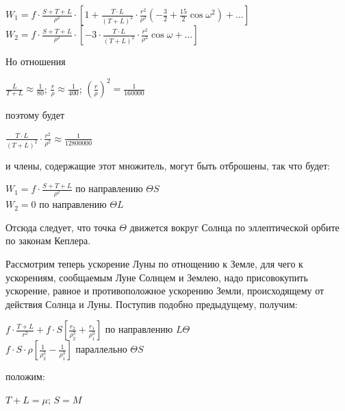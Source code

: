 \documentclass[a4paper,12pt]{article}
\begin{document}
\begin{center}
	$W_1 = f \cdot \frac{S+T+L}{\rho^2} \cdot \left[ 1+ \frac{T \cdot L}{(T+L)^2} \cdot \frac{r^2}{\rho^2}\left(-\frac{3}{2}+\frac{15}{2}\cos\omega^2 \right) + \ldots \right]$\\
	$W_2 = f \cdot \frac{S+T+L}{\rho^2} \cdot \left[ -3 \cdot \frac{T \cdot L}{(T+L)^2} \cdot \frac{r^2}{\rho^2} \cos \omega + \ldots \right]$
\end{center}

Но отношения 
\begin{center}
	$\frac{L}{T+L} \approx \frac{1}{80}$; $\frac{r}{\rho} \approx \frac{1}{400}$; $\left(\frac{r}{\rho} \right)^2=\frac{1}{160000}$
\end{center}
поэтому будет

\begin{center}
	$\frac{T \cdot L}{(T+L)^2}\cdot \frac{r^2}{\rho^2} \approx \frac{1}{12800000}$
\end{center}

и члены, содержащие этот множитель, могут быть отброшены, так что будет:
\begin{center}
	$W_1=f \cdot \frac{S+T+L}{\rho^2}$ по направлению $\Theta S$ \\
	$W_2 = 0$ по направлению $\Theta L$
\end{center}

Отсюда следует, что точка $\Theta$ движется вокруг Солнца по эллептической орбите по законам Кеплера.

Рассмотрим теперь ускорение Луны по отнощению к Земле, для чего к ускорениям, сообщаемым Луне Солнцем и Землею, надо присовокупить ускорение, равное и противоположное ускорению Земли, происходящему от действия Солнца и Луны. Поступив подобно предыдущему, получим:

\begin{center}
	$f \cdot \frac{T+L}{r^2}+f\cdot S \left[ \frac{r_2}{\rho_2^3} +\frac{r_1}{\rho_1^3}\right]$ по направлению $L\Theta$ \\
	$f \cdot S \cdot \rho \left[\frac{1}{\rho_2^3}-\frac{1}{\rho_1^3} \right]$ параллельно $\Theta S$
\end{center}

положим:

\begin{center}
	$T+L= \mu$; $S=M$
\end{center}



\listoffigures
\listoftables
\end{document}
